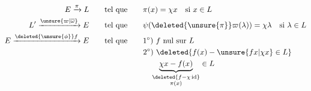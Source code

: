 \[
\begin{aligned}
E\xrightarrow{\pi}L&\qquad\text{tel que}\qquad \pi(x)=\chi x\quad\text{si }x\in L\\
L'\xrightarrow{\unsure{\varpi|\overline{\omega}}}E&\qquad\text{tel que}\qquad
\psi(\deleted{\unsure{\pi}}\varpi(\lambda))=\chi\lambda\quad\text{si }\lambda\in L\\
E\xrightarrow{\deleted{\unsure{\phi}}f}E&\qquad\text{tel que}\qquad
1^\circ)\ f\ \text{nul sur } L\\
&\hspace{7em}2^\circ)\ \deleted{f(x)-\unsure{fx|\chi x}\in L}\\
&\hspace{8em}\underbrace{\chi x-f(x)}_{\substack{\deleted{f-\chi\,\mathrm{id}}\\\pi(x)}}\in L
\end{aligned}
\]


